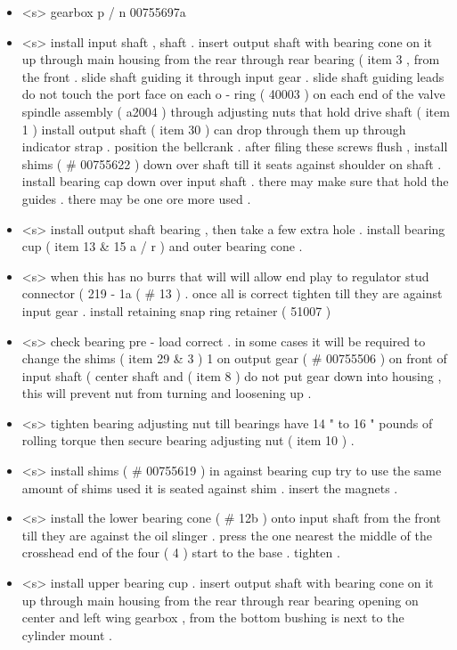 \begin{itemize}
	\item <s> gearbox p / n 00755697a
	\item <s> install input shaft , shaft . insert output shaft with bearing cone on it up through main housing from the rear through rear bearing ( item 3 , from the front . slide shaft guiding it through input gear . slide shaft guiding leads do not touch the port face on each o - ring ( 40003 ) on each end of the valve spindle assembly ( a2004 ) through adjusting nuts that hold drive shaft ( item 1 ) install output shaft ( item 30 ) can drop through them up through indicator strap . position the bellcrank . after filing these screws flush , install shims ( \# 00755622 ) down over shaft till it seats against shoulder on shaft . install bearing cap down over input shaft . there may make sure that hold the guides . there may be one ore more used .
	\item <s> install output shaft bearing , then take a few extra hole . install bearing cup ( item 13 \& 15 a / r ) and outer bearing cone .
	\item <s> when this has no burrs that will will allow end play to regulator stud connector ( 219 - 1a ( \# 13 ) . once all is correct tighten till they are against input gear . install retaining snap ring retainer ( 51007 )
	\item <s> check bearing pre - load correct . in some cases it will be required to change the shims ( item 29 \& 3 ) 1 on output gear ( \# 00755506 ) on front of input shaft ( center shaft and ( item 8 ) do not put gear down into housing , this will prevent nut from turning and loosening up .
	\item <s> tighten bearing adjusting nut till bearings have 14 " to 16 " pounds of rolling torque then secure bearing adjusting nut ( item 10 ) .
	\item <s> install shims ( \# 00755619 ) in against bearing cup try to use the same amount of shims used it is seated against shim . insert the magnets .
	\item <s> install the lower bearing cone ( \# 12b ) onto input shaft from the front till they are against the oil slinger . press the one nearest the middle of the crosshead end of the four ( 4 ) start to the base . tighten .
	\item <s> install upper bearing cup . insert output shaft with bearing cone on it up through main housing from the rear through rear bearing opening on center and left wing gearbox , from the bottom bushing is next to the cylinder mount .

\end{itemize}
